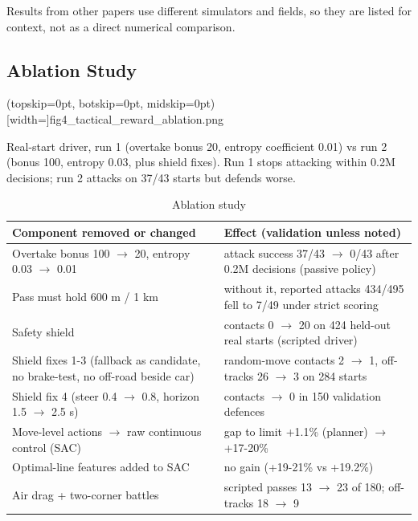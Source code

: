 \documentclass{ieeeaccess}
\begin{document}
Results from other papers use different simulators and fields, so they are listed
for context, not as a direct numerical comparison.

\subsection{Ablation Study}

\Figure[t!](topskip=0pt, botskip=0pt, midskip=0pt)[width=\textwidth]{fig4_tactical_reward_ablation.png}
{\parbox{0.92\textwidth}{Real-start driver, run 1 (overtake bonus 20, entropy coefficient 0.01) vs run 2 (bonus 100, entropy 0.03, plus shield fixes). Run 1 stops attacking within 0.2M decisions; run 2 attacks on 37/43 starts but defends worse.}\label{fig:fig4_tactical_reward_ablation}}

\begin{table}[!t]
\caption{Ablation study}
\label{tab:16}
\centering\footnotesize
\begin{tabularx}{\textwidth}{>{\raggedright\arraybackslash}X>{\raggedright\arraybackslash}X}
\hline
\textbf{Component removed or changed} & \textbf{Effect (validation unless noted)} \\
\hline
Overtake bonus 100 \ensuremath{\rightarrow} 20, entropy 0.03 \ensuremath{\rightarrow} 0.01 & attack success 37/43 \ensuremath{\rightarrow} 0/43 after 0.2M decisions (passive policy) \\
Pass must hold 600 m / 1 km & without it, reported attacks 434/495 fell to 7/49 under strict scoring \\
Safety shield & contacts 0 \ensuremath{\rightarrow} 20 on 424 held-out real starts (scripted driver) \\
Shield fixes 1-3 (fallback as candidate, no brake-test, no off-road beside car) & random-move contacts 2 \ensuremath{\rightarrow} 1, off-tracks 26 \ensuremath{\rightarrow} 3 on 284 starts \\
Shield fix 4 (steer 0.4 \ensuremath{\rightarrow} 0.8, horizon 1.5 \ensuremath{\rightarrow} 2.5 s) & 18 contacts \ensuremath{\rightarrow} 0 in 150 validation defences \\
Move-level actions \ensuremath{\rightarrow} raw continuous control (SAC) & gap to limit +1.1\% (planner) \ensuremath{\rightarrow} +17-20\% \\
Optimal-line features added to SAC & no gain (+19-21\% vs +19.2\%) \\
Air drag + two-corner battles & scripted passes 13 \ensuremath{\rightarrow} 23 of 180; off-tracks 18 \ensuremath{\rightarrow} 9 \\

\end{tabularx}
\end{table}
\end{document}
